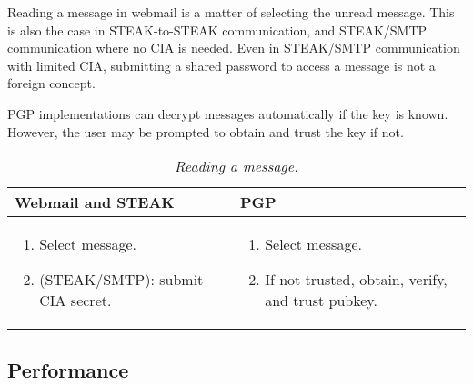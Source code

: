 Reading a message in webmail is a matter of selecting the unread message.  This is also the case in STEAK-to-STEAK communication, and STEAK/SMTP communication where no CIA is needed.  Even in STEAK/SMTP communication with limited CIA, submitting a shared password to access a message is not a foreign concept.

PGP implementations can decrypt messages automatically if the key is known.  However, the user may be prompted to obtain and trust the key if not.

\begin{table}[ht!]
\begin{tabular}{ | L{3.5cm} | L{3.5cm} |}
\hline
\textbf{Webmail and STEAK} & \textbf{PGP} \\
\hline
\vspace{-3mm}
\begin{enumerate}
  \item{Select message.}
  \item{(STEAK/SMTP): submit CIA secret.}
\end{enumerate}
\vspace{-3mm}
 &

\vspace{-3mm}
\begin{enumerate}
  \item{Select message.}
  \item{If not trusted, obtain, verify, and trust pubkey.}
\end{enumerate} 
\vspace{-\topsep} \\

\hline
\end{tabular}
\caption{\it Reading a message.}
\label{tab:account-creation}
\end{table}

\subsection{Performance}

